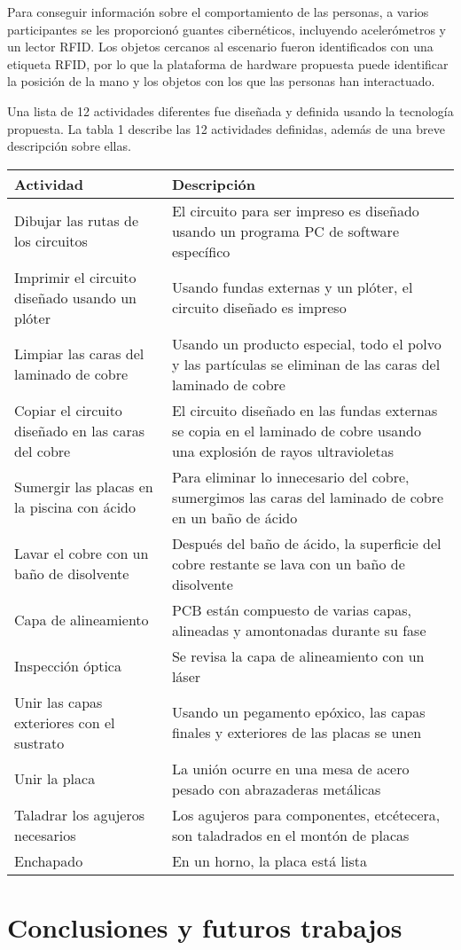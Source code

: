 \documentclass{article}
\begin{document}
Para conseguir información sobre el comportamiento de las personas, a varios participantes se les proporcionó guantes cibernéticos, incluyendo acelerómetros y un lector RFID. Los objetos cercanos al escenario fueron identificados con una etiqueta RFID, por lo que la plataforma de hardware propuesta puede identificar la posición de la mano y los objetos con los que las personas han interactuado. 

Una lista de 12 actividades diferentes fue diseñada y definida usando la tecnología propuesta. La tabla 1 describe las 12 actividades definidas, además de una breve descripción sobre ellas.

\begin{table}[t]
    \begin{center}
        \begin{tabular}{ | m{2cm} | m{5cm} | }
            \hline Actividad & Descripción \\ \hline
            Dibujar las rutas de los circuitos & El circuito para ser impreso es diseñado usando un programa PC de software específico \\ \hline
            Imprimir el circuito diseñado usando un plóter & Usando fundas externas y un plóter, el circuito diseñado es impreso \\ \hline
            Limpiar las caras del laminado de cobre & Usando un producto especial, todo el polvo y las partículas se eliminan de las caras del laminado de cobre \\ \hline
            Copiar el circuito diseñado en las caras del cobre & El circuito diseñado en las fundas externas se copia en el laminado de cobre usando una explosión de rayos ultravioletas \\ \hline
            Sumergir las placas en la piscina con ácido & Para eliminar lo innecesario del cobre, sumergimos las caras del laminado de cobre en un baño de ácido \\ \hline
            Lavar el cobre con un baño de disolvente & Después del baño de ácido, la superficie del cobre restante se lava con un baño de disolvente \\ \hline
            Capa de alineamiento & PCB están compuesto de varias capas, alineadas y amontonadas durante su fase \\ \hline
            Inspección óptica & Se revisa la capa de alineamiento con un láser \\ \hline
            Unir las capas exteriores con el sustrato & Usando un pegamento epóxico, las capas finales y exteriores de las placas se unen \\ \hline
            Unir la placa & La unión ocurre en una mesa de acero pesado con abrazaderas metálicas \\ \hline
            Taladrar los agujeros necesarios & Los agujeros para componentes, etcétecera, son taladrados en el montón de placas \\ \hline
            Enchapado & En un horno, la placa está lista \\ \hline
            
            

        \end{tabular}
    \end{center}
\end{table}
\section {Conclusiones y futuros trabajos}
\end{document}
